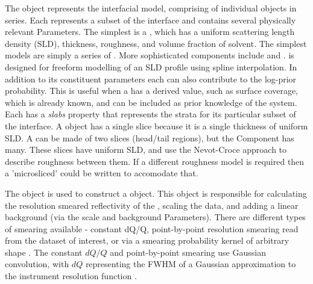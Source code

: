 \documentclass[12pt]{article}
\begin{document}
The \Structure object represents the interfacial model, comprising of individual \Component objects in series. Each \Component represents a subset of the interface and contains several physically relevant Parameters. The simplest \Component is a \Slab, which has a uniform scattering length density (SLD), thickness, roughness, and volume fraction of solvent. The simplest models are simply a series of \Slab. More sophisticated components include \LipidLeaflet and \Spline. \Spline is designed for freeform modelling of an SLD profile using spline interpolation. In addition to its constituent parameters each \Component can also contribute to the log-prior probability. This is useful when a \Component has a derived value, such as surface coverage, which is already known, and can be included as prior knowledge of the system. Each \Component has a \emph{slabs} property that represents the strata for its particular subset of the interface. A \Slab object has a single slice because it is a single thickness of uniform SLD. A \LipidLeaflet can be made of two slices (head/tail regions), but the \Spline Component has many. These slices have uniform SLD, and use the Nevot-Croce approach \cite{Nevot1980} to describe roughness between them. If a different roughness model is required then a 'microsliced' \Component could be written to accomodate that.

The \Structure object is used to construct a \ReflectModel object. This object is responsible for calculating the resolution smeared reflectivity of the \Structure, scaling the data, and adding a linear background (via the scale and background Parameters). There are different types of smearing available - constant dQ/Q, point-by-point resolution smearing read from the dataset of interest, or via a smearing probability kernel of arbitrary shape \cite{Nelson2014}. The constant $dQ/Q$ and point-by-point smearing use Gaussian convolution, with $dQ$ representing the FWHM of a Gaussian approximation to the instrument resolution function \cite{Well2005}.
\end{document}
